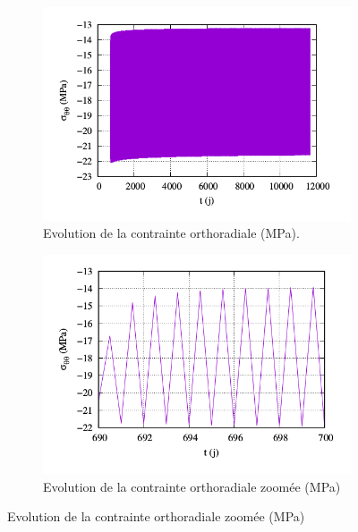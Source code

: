 \documentclass[11pt,french,a4paper]{article}
\begin{document}
    \begin{figure}[h!]
    \centering
    
    \begin{subfigure}[b]{0.4\linewidth}
        \includegraphics[width=\linewidth]{image/annexe/cav_sal/P2M_bon/stt.png}
        \caption{Evolution de la contrainte orthoradiale (MPa).}
    \end{subfigure}
    \hspace{1cm}
    \begin{subfigure}[b]{0.4\linewidth}
        \includegraphics[width=\linewidth]{image/annexe/cav_sal/P2M_bon/stt_zoom.png}
        \caption{Evolution de la contrainte orthoradiale zoomée (MPa)}
    \end{subfigure}
    

\end{figure}
\end{document}
